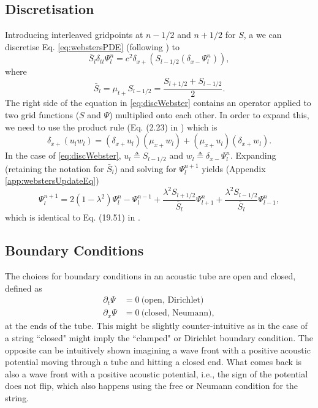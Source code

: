 \documentclass[dvipsnames]{article}
\def\dxp{\delta_{x+}}
\def\dxm{\delta_{x-}}
\def\mup{\mu_{x+}}
\def\Sp{S_{l+1/2}}
\def\Sm{S_{l-1/2}}
\def\Psilp{\Psi_{l+1}^n}
\def\Psilm{\Psi_{l-1}^n}
\def\Psinp{\Psi_l^{n+1}}
\def\Psinm{\Psi_l^{n-1}}
\def\Psiln{\Psi_l^n}
\def\Sbar{\bar S_l}
\begin{document}
\subsection{Discretisation}
Introducing interleaved gridpoints at $n-1/2$ and $n+1/2$ for $S$, a we can discretise Eq. \eqref{eq:webstersPDE} (following \cite{Bilbao2018}) to
\begin{equation}\label{eq:discWebster}
    \Sbar \delta_{tt}\Psi^n_l = c^2\dxp(\Sm(\delta_{x-}\Psiln)),
\end{equation}
where
\begin{equation}
    \Sbar = \mu_{t+}\Sm = \frac{\Sp + \Sm}{2}.
\end{equation}
The right side of the equation in \eqref{eq:discWebster} contains an operator applied to two grid functions ($S$ and $\Psi$) multiplied onto each other. In order to expand this, we need to use the product rule (Eq. (2.23) in \cite{Bilbao2009}) which is
\begin{equation}
    \dxp (u_lw_l) = (\dxp u_l)(\mup{w_l}) + (\mup u_l)(\dxp w_l).
\end{equation}
In the case of \eqref{eq:discWebster}, $u_l \triangleq \Sm$ and $w_l \triangleq \dxm\Psiln$. Expanding (retaining the notation for $\Sbar$) and solving for $\Psinp$ yields (Appendix \ref{app:webstersUpdateEq})
\begin{equation}
    \Psinp = 2(1-\lambda^2)\Psiln-\Psinm+ \frac{\lambda^2\Sp}{\Sbar}\Psilp + \frac{\lambda^2\Sm}{\Sbar}\Psilm,\label{eq:webstersUpdateEq}
\end{equation}
which is identical to Eq. (19.51) in \cite{Bilbao2018}.

\subsection{Boundary Conditions}
The choices for boundary conditions in an acoustic tube are open and closed, defined as \cite{Bilbao2018}
\begin{equation}
    \begin{split}
        \partial_t\Psi &= 0\ \text{(open, Dirichlet)}\\
        \partial_x\Psi &= 0\ \text{(closed, Neumann)},
    \end{split}
\end{equation} 
at the ends of the tube. This might be slightly counter-intuitive as in the case of a string ``closed" might imply the ``clamped" or Dirichlet boundary condition. The opposite can be intuitively shown imagining a wave front with a positive acoustic potential moving through a tube and hitting a closed end. What comes back is also a wave front with a positive acoustic potential, i.e., the sign of the potential does not flip, which also happens using the free or Neumann condition for the string.
\end{document}
